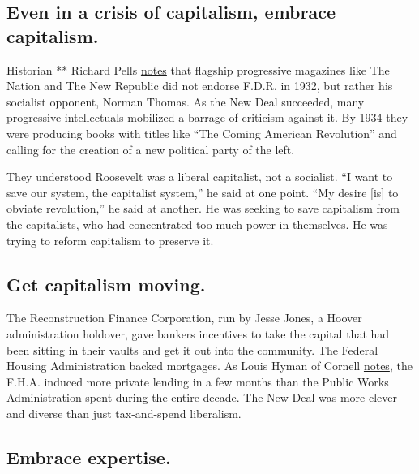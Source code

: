 \hypertarget{even-in-a-crisis-of-capitalism-embrace-capitalism}{%
\subsection{Even in a crisis of capitalism, embrace
capitalism.}\label{even-in-a-crisis-of-capitalism-embrace-capitalism}}

Historian ** Richard Pells
\href{https://www.google.com/books/edition/Radical_Visions_and_American_Dreams/ENEKTEdhhtMC?hl=en\&gbpv=0}{notes}
that flagship progressive magazines like The Nation and The New Republic
did not endorse F.D.R. in 1932, but rather his socialist opponent,
Norman Thomas. As the New Deal succeeded, many progressive intellectuals
mobilized a barrage of criticism against it. By 1934 they were producing
books with titles like ``The Coming American Revolution'' and calling
for the creation of a new political party of the left.

They understood Roosevelt was a liberal capitalist, not a socialist. ``I
want to save our system, the capitalist system,'' he said at one point.
``My desire {[}is{]} to obviate revolution,'' he said at another. He was
seeking to save capitalism from the capitalists, who had concentrated
too much power in themselves. He was trying to reform capitalism to
preserve it.

\hypertarget{get-capitalism-moving}{%
\subsection{Get capitalism moving.}\label{get-capitalism-moving}}

The Reconstruction Finance Corporation, run by Jesse Jones, a Hoover
administration holdover, gave bankers incentives to take the capital
that had been sitting in their vaults and get it out into the community.
The Federal Housing Administration backed mortgages. As Louis Hyman of
Cornell
\href{https://www.theatlantic.com/ideas/archive/2019/03/surprising-truth-about-roosevelts-new-deal/584209/}{notes},
the F.H.A. induced more private lending in a few months than the Public
Works Administration spent during the entire decade. The New Deal was
more clever and diverse than just tax-and-spend liberalism.

\hypertarget{embrace-expertise}{%
\subsection{Embrace expertise.}\label{embrace-expertise}}


